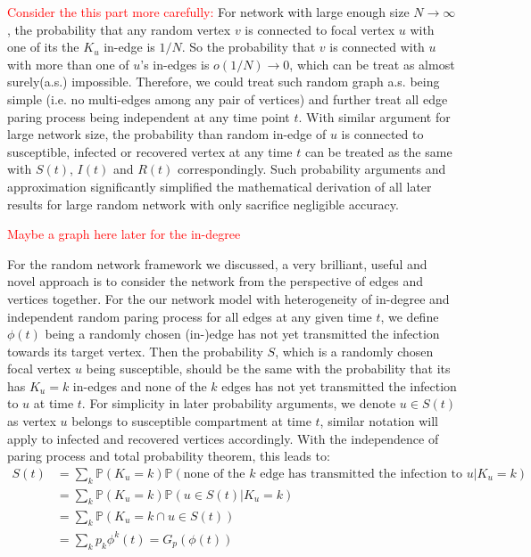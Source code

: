 \documentclass[12pt]{article}
\theoremstyle{plain}
\theoremstyle{definition}
\begin{document}
\textcolor{red}{Consider the this part more carefully:} For network with large enough size $N \rightarrow \infty$, the probability that any random vertex $v$ is connected to focal vertex $u$ with one of its the $K_u$ in-edge is $1/N$.
So the probability that $v$ is connected with $u$ with more than one of $u$'s in-edges is $o(1/N)\rightarrow 0$, which can be treat as almost surely(a.s.) impossible.
Therefore, we could treat such random graph a.s. being simple (i.e. no multi-edges among any pair of vertices) and further treat all edge paring process being independent at any time point $t$.
With similar argument for large network size, the probability than random in-edge of $u$ is connected to susceptible, infected or recovered vertex at any time $t$ can be treated as the same with $S(t)$, $I(t)$ and $R(t)$ correspondingly.
Such probability arguments and approximation significantly simplified the mathematical derivation of all later results for large random network with only sacrifice negligible accuracy.

\textcolor{red}{Maybe a graph here later for the in-degree}

For the random network framework we discussed, a very brilliant, useful and novel approach is to consider the network from the perspective of edges and vertices together. 
For the our network model with heterogeneity of in-degree and independent random paring process for all edges at any given time $t$, we define $\phi(t)$ being a randomly chosen (in-)edge has not yet transmitted the infection towards its target vertex.
Then the probability $S$, which is a randomly chosen focal vertex $u$ being susceptible, should be the same with the probability that its has $K_u=k$ in-edges and none of the $k$ edges has not yet transmitted the infection to $u$ at time $t$.
For simplicity in later probability arguments, we denote $u \in S(t)$ as vertex $u$ belongs to susceptible compartment at time $t$, similar notation will apply to infected and recovered vertices accordingly.
With the independence of paring process and total probability theorem, this leads to:
\begin{equation}
	\label{eqn: Seqn}
	\begin{aligned}		
		S(t) &=\sum_{k}\mathbb{P}(K_u=k)\mathbb{P}(\text{none of the } k \text{ edge has transmitted the infection to }u |K_u=k)
		\\
		&=\sum_{k}\mathbb{P}(K_u=k)\mathbb{P}(u\in S(t) |K_u=k)
		\\
		&=\sum_{k}\mathbb{P}(K_u=k \cap u\in S(t))
		\\
		&= \sum_{k} p_k \phi^k(t) = G_p(\phi(t))
	\end{aligned}
\end{equation}
\end{document}
